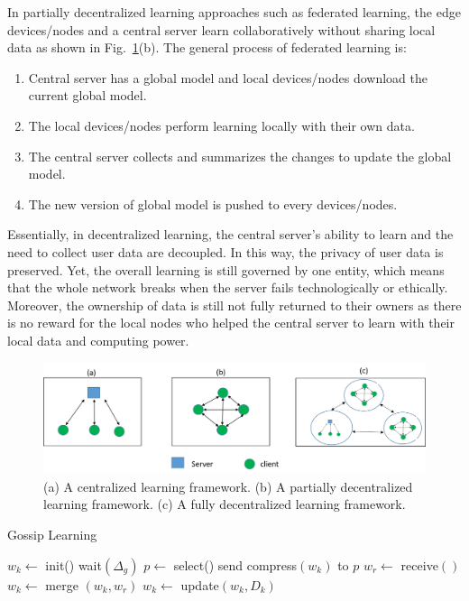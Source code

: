\documentclass[11pt,letterpaper]{article}
\begin{document}
In partially decentralized learning approaches such as federated learning, the edge devices/nodes and a central server learn collaboratively without sharing local data as shown in Fig.~\ref{fig:FL}(b). The general process of federated learning is:
\begin{enumerate}
  \item Central server has a global model and local devices/nodes download the current global model.
  \item The local devices/nodes perform learning locally with their own data.
  \item The central server collects and summarizes the changes to update the global model.
  \item The new version of global model is pushed to every devices/nodes.
\end{enumerate}
Essentially, in decentralized learning, the central server's ability to learn and the need to collect user data are decoupled. In this way, the privacy of user data is preserved. Yet, the overall learning is still governed by one entity, which means that the whole network breaks when the server fails technologically or ethically. Moreover, the ownership of data is still not fully returned to their owners as there is no reward for the local nodes who helped the central server to learn with their local data and computing power. 

\begin{figure}[t]
\centering
	\includegraphics[width=6in]{fig/FL.png}
	\caption{(a) A centralized learning framework. (b) A partially decentralized learning framework. (c) A fully decentralized learning framework. } 
\label{fig:FL}
\vspace{3pt}
\end{figure}

\begin{algorithm}
\caption{Gossip Learning}\label{alg:gossip}
\begin{algorithmic}[1]
\State $w_k \gets$ init()
\Loop
    \State wait$(\Delta_g)$     
    \State $p \leftarrow$ select()   
    \State send compress$(w_k)$ to $p$
    \State $w_r \gets$ receive$()$  
    \State $w_k \gets$ merge $(w_k,w_r)$
    \State $w_k \gets$ update$(w_k,D_k)$
\EndLoop
\end{algorithmic}
\end{algorithm}
\end{document}
